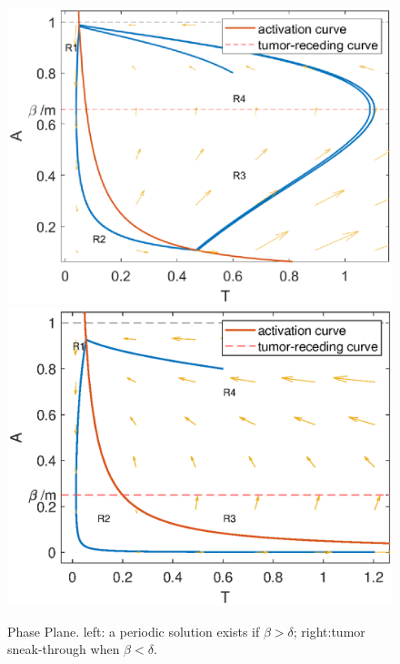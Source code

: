 \documentclass[review,authoryear]{elsarticle}
\begin{document}
\begin{figure}
\centerline{\includegraphics[width=0.3\paperwidth]{figs/phase_plane_periodic_DA}\includegraphics[width=0.3\paperwidth]{figs/phase_plane_sneakthru_DA}}

\caption{Phase Plane. left: a periodic solution exists if $\beta>\delta$;
right:tumor sneak-through when $\beta<\delta$.\label{fig:PP-DA} }

\end{figure}
\end{document}
